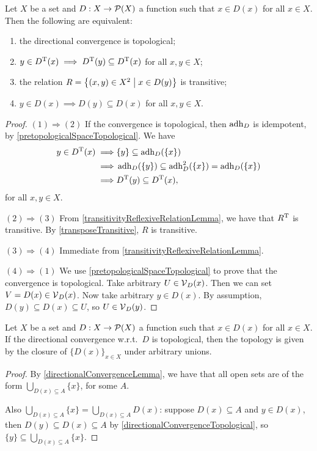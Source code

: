 \begin{proposition} \label{directionalConvergenceTopological}
Let $X$ be a set and $D: X\to \operatorname{\mathcal{P}}(X)$ a function such that $x\in D(x)$ for all $x\in X$. Then the following are equivalent:
\begin{enumerate}
\item the directional convergence is topological;
\item $y\in D^{\mathrm{T}}(x) \implies D^{\mathrm{T}}(y)\subseteq D^{\mathrm{T}}(x)$ for all $x,y\in X$;
\item the relation $R = \setbuilder{(x,y)\in X^2}{x\in D(y)}$ is transitive;
\item $y\in D(x) \implies D(y)\subseteq D(x)$ for all $x,y\in X$.
\end{enumerate}
\end{proposition}
\begin{proof}
$(1) \Rightarrow (2)$ If the convergence is topological, then $\operatorname{adh}_D$ is idempotent, by \ref{pretopologicalSpaceTopological}.
We have
\begin{align*}
y\in D^{\mathrm{T}}(x) \implies& \{y\} \subseteq \operatorname{adh}_D(\{x\}) \\ \implies& \operatorname{adh}_D(\{y\}) \subseteq \operatorname{adh}_D^2(\{x\}) = \operatorname{adh}_D(\{x\}) \\
\implies& D^{\mathrm{T}}(y)\subseteq D^{\mathrm{T}}(x),
\end{align*}
for all $x,y\in X$.

$(2) \Rightarrow (3)$ From \ref{transitivityReflexiveRelationLemma}, we have that $R^{\mathrm{T}}$ is transitive. By \ref{transposeTransitive}, $R$ is transitive.

$(3) \Rightarrow (4)$ Immediate from \ref{transitivityReflexiveRelationLemma}.

$(4) \Rightarrow (1)$ We use \ref{pretopologicalSpaceTopological} to prove that the convergence is topological. Take arbitrary $U\in \operatorname{\mathcal{V}}_D(x)$. Then we can set $V = D(x)\in \operatorname{\mathcal{V}}_D(x)$. Now take arbitrary $y\in D(x)$. By assumption, $D(y) \subseteq D(x) \subseteq U$, so $U\in \operatorname{\mathcal{V}}_D(y)$.
\end{proof}

\begin{proposition}
Let $X$ be a set and $D: X\to \operatorname{\mathcal{P}}(X)$ a function such that $x\in D(x)$ for all $x\in X$. If the directional convergence w.r.t.\ $D$ is topological, then the topology is given by the closure of $\{D(x)\}_{x\in X}$ under arbitrary unions.
\end{proposition}
\begin{proof}
By \ref{directionalConvergenceLemma}, we have that all open sets are of the form $\bigcup_{D(x)\subseteq A}\{x\}$, for some $A$.

Also $\bigcup_{D(x)\subseteq A}\{x\} = \bigcup_{D(x)\subseteq A}D(x)$: suppose $D(x)\subseteq A$ and $y\in D(x)$, then $D(y)\subseteq D(x)\subseteq A$ by \ref{directionalConvergenceTopological}, so $\{y\}\subseteq \bigcup_{D(x)\subseteq A}\{x\}$.
\end{proof}

